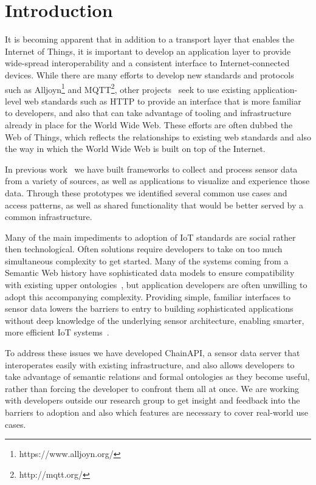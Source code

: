 \documentclass{acm_proc_article-sp}
\begin{document}
\section{Introduction}

It is becoming apparent that in addition to a transport layer that enables the
Internet of Things, it is important to develop an application layer to provide
wide-spread interoperability and a consistent interface to Internet-connected
devices. While there are many efforts to develop new standards and
protocols such as Alljoyn\footnote{https://www.alljoyn.org/} and
MQTT\footnote{http://mqtt.org/}, other projects~\cite{guinard2010} seek to
use existing application-level web standards such as HTTP to provide an
interface that is more familiar to developers, and also that can take advantage
of tooling and infrastructure already in place for the World Wide Web.
These efforts are often dubbed the Web of Things, which reflects the
relationships to existing web standards and also the way in which the World
Wide Web is built on top of the Internet.

In previous work~\cite{doppellab}\cite{gestures} we have built frameworks to collect
and process sensor data from a variety of sources, as well as applications to
visualize and experience those data. Through these prototypes we identified
several common use cases and access patterns, as well as shared functionality
that would be better served by a common infrastructure.

Many of the main impediments to adoption of IoT standards are social
rather then technological. Often solutions require developers to take on too much
simultaneous complexity to get started. Many of the systems coming from a Semantic
Web history have sophisticated data models to ensure compatibility with existing
upper ontologies~\cite{w3contology}\cite{broring2011}\cite{eid2007}, but
application developers are often unwilling to adopt this accompanying
complexity. Providing simple, familiar interfaces to sensor data lowers
the barriers to entry to building sophisticated applications without deep
knowledge of the underlying sensor architecture, enabling smarter, more
efficient IoT systems~\cite{aldrich2013}.

To address these issues we have developed ChainAPI, a sensor data server that
interoperates easily with existing infrastructure, and also allows developers
to take advantage of semantic relations and formal ontologies as they become
useful, rather than forcing the developer to confront them all at once. We are
working with developers outside our research group to get insight and feedback
into the barriers to adoption and also which features are necessary to cover
real-world use cases.
\end{document}
